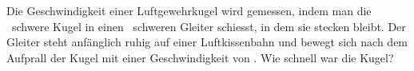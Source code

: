 Die Geschwindigkeit einer Luftgewehrkugel wird gemessen, indem man die \mKgO\ schwere Kugel in einen \mGlO\ schweren Gleiter schiesst, in dem sie stecken bleibt. Der Gleiter steht anfänglich ruhig auf einer Luftkissenbahn und bewegt sich nach dem Aufprall der Kugel mit einer Geschwindigkeit von \uGlO. Wie schnell war die Kugel?
